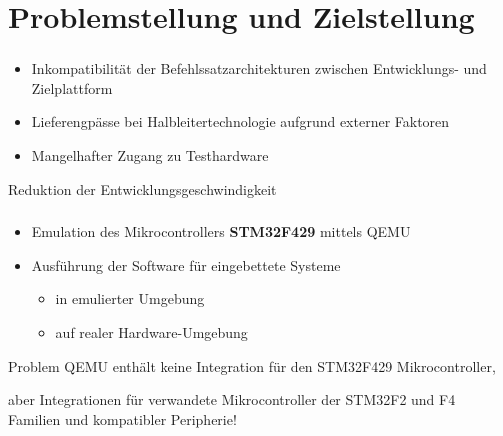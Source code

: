 
\section{Problemstellung und Zielstellung}

\begin{frame}[fragile]
    \begin{center}
        \huge\textbf{\insertsection}
    \end{center}
\end{frame}

\begin{frame}[fragile]
\frametitle{\insertsection}

\begin{itemize}
    \item Inkompatibilität der Befehlssatzarchitekturen zwischen Entwicklungs-
        und Zielplattform
    \item Lieferengpässe bei Halbleitertechnologie aufgrund externer Faktoren
    \item Mangelhafter Zugang zu Testhardware
\end{itemize}
\vspace{5mm}
\hspace{5mm}\rightarrow\hspace{2mm} Reduktion der Entwicklungsgeschwindigkeit
\end{frame}

\begin{frame}[fragile]
\frametitle{\insertsection}

\begin{itemize}
    \item Emulation des Mikrocontrollers \textbf{STM32F429} mittels QEMU
    \item Ausführung der Software für eingebettete Systeme
    \begin{itemize}
        \item in emulierter Umgebung
        \item auf realer Hardware-Umgebung
    \end{itemize}
\end{itemize}
\begin{alertblock}{Problem}
    QEMU enthält keine Integration für den STM32F429 Mikrocontroller,
\end{alertblock}
\vspace{3mm}
aber Integrationen für verwandete Mikrocontroller der STM32F2 und F4
Familien und kompatibler Peripherie!

\end{frame}

